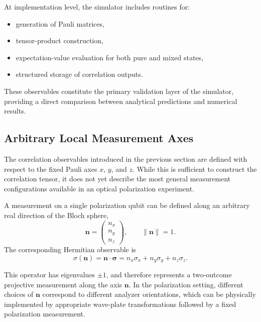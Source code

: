 \documentclass[a4paper]{article}
\begin{document}
At implementation level, the simulator includes routines for:
\begin{itemize}
    \item generation of Pauli matrices,
    \item tensor-product construction,
    \item expectation-value evaluation for both pure and mixed states,
    \item structured storage of correlation outputs.
\end{itemize}

These observables constitute the primary validation layer of the simulator, providing a direct comparison between analytical predictions and numerical results.

\subsection{Arbitrary Local Measurement Axes}

The correlation observables introduced in the previous section are defined with respect to the fixed Pauli axes \(x\), \(y\), and \(z\). While this is sufficient to construct the correlation tensor, it does not yet describe the most general measurement configurations available in an optical polarization experiment.

\medskip

A measurement on a single polarization qubit can be defined along an arbitrary real direction of the Bloch sphere,
\[
\mathbf{n} =
\begin{pmatrix}
n_x\\
n_y\\
n_z
\end{pmatrix},
\qquad
\|\mathbf{n}\|=1.
\]
The corresponding Hermitian observable is
\[
\sigma(\mathbf{n})
=
\mathbf{n}\cdot\boldsymbol{\sigma}
=
n_x\sigma_x+n_y\sigma_y+n_z\sigma_z.
\]

\medskip

This operator has eigenvalues \(\pm 1\), and therefore represents a two-outcome projective measurement along the axis \(\mathbf{n}\). In the polarization setting, different choices of \(\mathbf{n}\) correspond to different analyzer orientations, which can be physically implemented by appropriate wave-plate transformations followed by a fixed polarization measurement.
\end{document}
